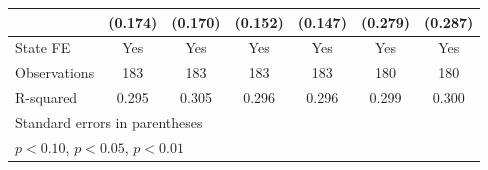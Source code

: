 {\begin{tabular}{l*{6}{c}}
                    &     (0.174)         &     (0.170)         &     (0.152)         &     (0.147)         &     (0.279)         &     (0.287)         \\
\midrule
State FE            &         Yes         &         Yes         &         Yes         &         Yes         &         Yes         &         Yes         \\
Observations        &         183         &         183         &         183         &         183         &         180         &         180         \\
R-squared           &       0.295         &       0.305         &       0.296         &       0.296         &       0.299         &       0.300         \\
\bottomrule
\multicolumn{7}{l}{\footnotesize Standard errors in parentheses}\\
\multicolumn{7}{l}{\footnotesize \sym{*} \(p<0.10\), \sym{**} \(p<0.05\), \sym{***} \(p<0.01\)}\\
\end{tabular}
}
